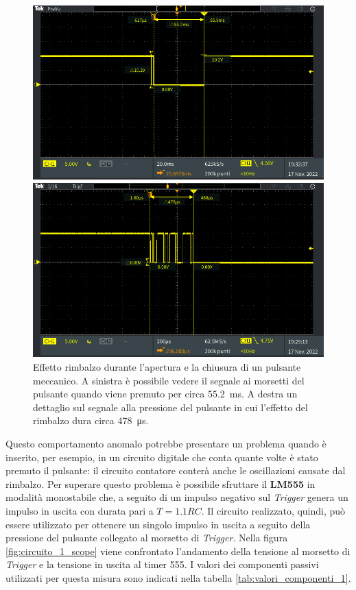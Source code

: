 \begin{figure}[tbh]
	\centering
	\begin{minipage}{.496\textwidth}
		\includegraphics[width=\linewidth]{./ImageFiles/Laboratorio 5/TEK00003.PNG}
	\end{minipage}
	\begin{minipage}{.496\textwidth}
		\includegraphics[width=\linewidth]{./ImageFiles/Laboratorio 5/TEK00002.PNG}
	\end{minipage}
	\caption{Effetto rimbalzo durante l'apertura e la chiusura di un pulsante meccanico. A sinistra è possibile vedere il segnale ai morsetti del pulsante quando viene premuto per circa \SI{55.2}{\milli\second}. A destra un dettaglio sul segnale alla pressione del pulsante in cui l'effetto del rimbalzo dura circa \SI{478}{\micro\second}.}
	\label{fig:switch_bouncing}
\end{figure}
Questo comportamento anomalo potrebbe presentare un problema quando è inserito, per esempio, in un circuito digitale che conta quante volte è stato premuto il pulsante: il circuito contatore conterà anche le oscillazioni causate dal rimbalzo. Per superare questo problema è possibile sfruttare il \textbf{LM555} in modalità monostabile che, a seguito di un impulso negativo sul \textit{Trigger} genera un impulso in uscita con durata pari a $T=1.1RC$. Il circuito realizzato, quindi, può essere utilizzato per ottenere un singolo impulso in uscita a seguito della pressione del pulsante collegato al morsetto di \textit{Trigger}. Nella figura \ref{fig:circuito_1_scope} viene confrontato l'andamento della tensione al morsetto di \textit{Trigger} e la tensione in uscita al timer 555. I valori dei componenti passivi utilizzati per questa misura sono indicati nella tabella \ref{tab:valori_componenti_1}.

